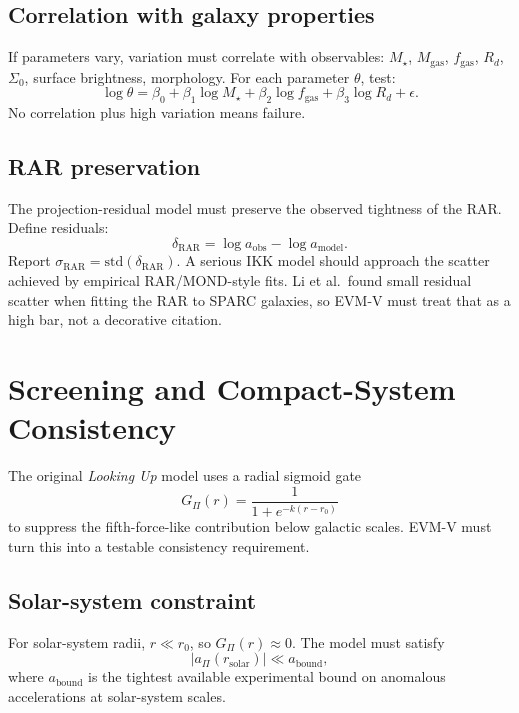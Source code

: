 \documentclass[11pt,a4paper,oneside]{article}
\newcommand{\aobs}{a_{\mathrm{obs}}}
\newcommand{\aPi}{a_{\Pi}}
\newcommand{\rzero}{r_0}
\newcommand{\GPi}{G_{\Pi}}
\newcommand{\Mstar}{M_{\star}}
\newcommand{\fgas}{f_{\mathrm{gas}}}
\newcommand{\Rd}{R_d}
\begin{document}
\subsection{Correlation with galaxy properties}

If parameters vary, variation must correlate with observables: $\Mstar$,
$M_{\mathrm{gas}}$, $\fgas$, $\Rd$, $\Sigma_0$, surface brightness, morphology. For
each parameter $\theta$, test:
\[
    \log\theta = \beta_0 + \beta_1\log\Mstar + \beta_2\log\fgas
    + \beta_3\log\Rd + \epsilon.
\]
No correlation plus high variation means failure.

\subsection{RAR preservation}

The projection-residual model must preserve the observed tightness of the RAR. Define
residuals:
\[
    \delta_{\mathrm{RAR}} = \log\aobs - \log a_{\mathrm{model}}.
\]
Report $\sigma_{\mathrm{RAR}} = \mathrm{std}(\delta_{\mathrm{RAR}})$. A serious IKK
model should approach the scatter achieved by empirical RAR/MOND-style fits. Li et al.\
found small residual scatter when fitting the RAR to SPARC galaxies, so EVM-V must
treat that as a high bar, not a decorative citation.

\section{Screening and Compact-System Consistency}

The original \emph{Looking Up} model uses a radial sigmoid gate
\[
    \GPi(r) = \frac{1}{1 + e^{-k(r-\rzero)}}
\]
to suppress the fifth-force-like contribution below galactic scales. EVM-V must turn
this into a testable consistency requirement.

\subsection{Solar-system constraint}

For solar-system radii, $r \ll \rzero$, so $\GPi(r) \approx 0$. The model must satisfy
\[
    |\aPi(r_{\mathrm{solar}})| \ll a_{\mathrm{bound}},
\]
where $a_{\mathrm{bound}}$ is the tightest available experimental bound on anomalous
accelerations at solar-system scales.
\end{document}

